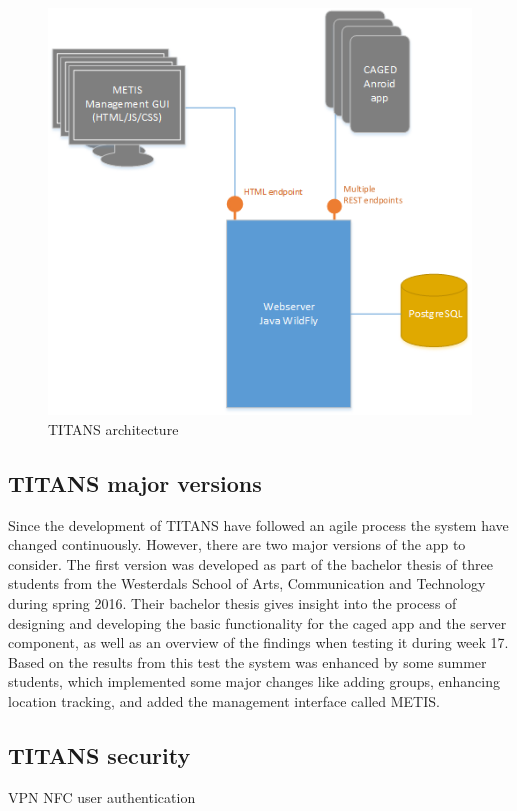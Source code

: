 \begin{figure}
\label{fig:titans_architecture}
\centering
\includegraphics[width=0.8\columnwidth]{content/img/Titans_system_sketch.png}
\caption{TITANS architecture}
\end{figure}

\subsection{TITANS major versions}
Since the development of TITANS have followed an agile process the system have changed continuously. However, there are two major versions of the app to consider. The first version was developed as part of the bachelor thesis of three students from the Westerdals School of Arts, Communication and Technology during spring 2016. Their bachelor thesis \cite{gudmundsen_communication_2016} gives insight into the process of designing and developing the basic functionality for the \gls{caged} app and the server component, as well as an overview of the findings when testing it during week 17. Based on the results from this test the system was enhanced by some summer students, which implemented some major changes like adding groups, enhancing location tracking, and added the management interface called METIS. 

\subsection{TITANS security}
VPN
NFC user authentication

